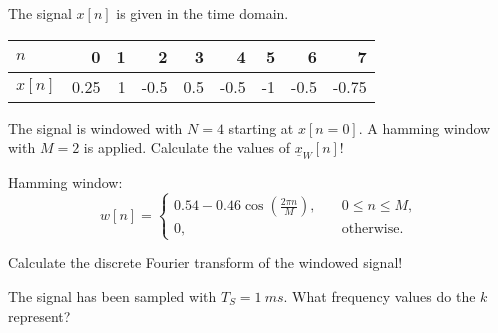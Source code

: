 \begin{question}[subtitle={Sampling Non-Periodic Signals}]
	The signal $x[n]$ is given in the time domain.
	\begin{table}[H]
		\centering
		\begin{tabular}{|l|r|r|r|r|r|r|r|r|}
			\hline
			$n$ & 0 & 1 & 2 & 3 & 4 & 5 & 6 & 7 \\
			\hline
			\hline
			$x[n]$ & 0.25 & 1 & -0.5 & 0.5 & -0.5 & -1 & -0.5 & -0.75 \\
			\hline
		\end{tabular}
	\end{table}
	
	\begin{tasks}
		\task
		The signal is windowed with $N = 4$ starting at $x[n = 0]$. A hamming window with $M = 2$ is applied. Calculate the values of $\underline{x}_W[n]$!
		
		Hamming window:
		\begin{equation*}
			w[n] = \begin{cases}0.54 - 0.46 \cos\left(\frac{2 \pi n}{M}\right), &\quad 0 \leq n \leq M,\\ 0, &\quad \text{otherwise}.\end{cases}
		\end{equation*}
		
		\task
		Calculate the discrete Fourier transform of the windowed signal!
		
		\task
		The signal has been sampled with $T_S = \SI{1}{ms}$. What frequency values do the $k$ represent?
	\end{tasks}
\end{question}

